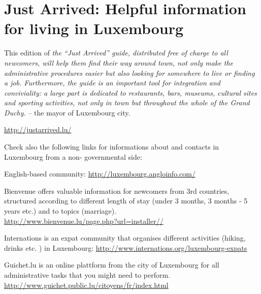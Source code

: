 \section{Just Arrived: Helpful information for living in Luxembourg}
This edition of \textit{the ``Just Arrived'' guide, distributed free of charge to all newcomers, will help them find their way around town, not only make the administrative procedures easier but also looking for somewhere to live or finding a job.  Furthermore, the guide is an important tool for integration and conviviality: a large part is dedicated to restaurants, bars, museums, cultural sites and sporting activities, not only in town but throughout the whole of the Grand
Duchy.} -- the mayor of Luxembourg city.
 
\url{http://justarrived.lu/}
 
Check also the following links for informations about and contacts in Luxembourg from a non- governmental side:

English-based community: \url{http://luxembourg.angloinfo.com/}

Bienvenue offers valuable information for newcomers from 3rd countries, structured according to different length of stay (under 3 months, 3 months - 5 years etc.) and to topics (marriage).\\ 
\url{http://www.bienvenue.lu/page.php?url=installer//}

Internations is an expat community that organises different activities (hiking, drinks etc. ) in Luxembourg: \url{http://www.internations.org/luxembourg-expats}

Guichet.lu is an online plattform from the city of Luxembourg for all administrative tasks that you might need to perform.\\
\url{http://www.guichet.public.lu/citoyens/fr/index.html}\\
 